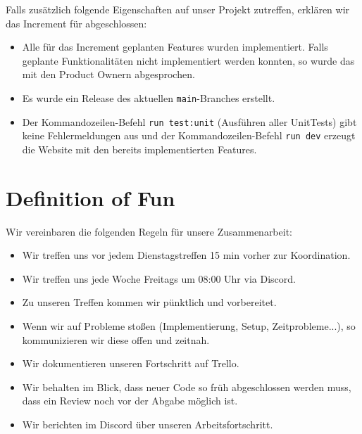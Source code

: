\documentclass[titlepage]{scrartcl}
\begin{document}
Falls zusätzlich folgende Eigenschaften auf unser Projekt zutreffen, erklären wir das Increment für abgeschlossen:
\begin{itemize}
	\item Alle für das Increment geplanten Features wurden implementiert. Falls geplante Funktionalitäten nicht implementiert werden konnten, so wurde das mit den Product Ownern abgesprochen.
	\item Es wurde ein Release des aktuellen \texttt{main}-Branches erstellt.
	\item Der Kommandozeilen-Befehl \texttt{run test:unit} (Ausführen aller UnitTests) gibt keine Fehlermeldungen aus und der Kommandozeilen-Befehl \texttt{run dev} erzeugt die Website mit den bereits implementierten Features. %
\end{itemize}

\section{Definition of Fun}%
Wir vereinbaren die folgenden Regeln für unsere Zusammenarbeit:
\begin{itemize}
	\item Wir treffen uns vor jedem Dienstagstreffen 15 min vorher zur Koordination.
	\item Wir treffen uns jede Woche Freitags um 08:00 Uhr via Discord.
	\item Zu unseren Treffen kommen wir pünktlich und vorbereitet.
	\item Wenn wir auf Probleme stoßen (Implementierung, Setup, Zeitprobleme...), so kommunizieren wir diese offen und zeitnah.
	\item Wir dokumentieren unseren Fortschritt auf Trello.
	\item Wir behalten im Blick, dass neuer Code so früh abgeschlossen werden muss, dass ein Review noch vor der Abgabe möglich ist.
	\item Wir berichten im Discord über unseren Arbeitsfortschritt.
\end{itemize}
\end{document}
